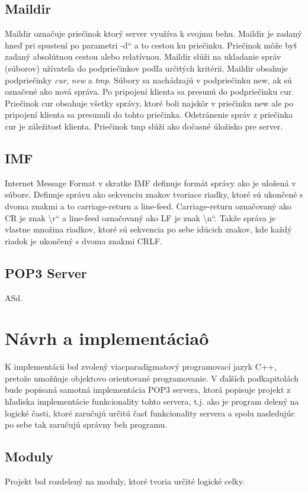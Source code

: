 \documentclass[11pt,a4paper]{article}
\providecommand{\uv}[1]{\quotedblbase #1\textquotedblleft}
\begin{document}
\subsection{Maildir}
Maildir označuje priečinok ktorý server využíva k svojmu behu. Maildir je zadaný hneď pri spustení po parametri \uv{-d} a to cestou ku priečinku. Priečinok môže byť zadaný absolútnou cestou alebo relatívnou. Maildir slúži na ukladanie správ (súborov) užívateľa do podpriečinkov podľa určitých kritérii. Maildir obsahuje podpriečinky \textit{cur}, \textit{new} a \textit{tmp}. Súbory sa nachádzajú v podpriečinku new, ak sú označené ako nová správa. Po pripojení klienta sa presunú do podpriečinku cur. Priečinok cur obsahuje všetky správy, ktoré boli najskôr v priečinku new ale po pripojení klienta sa presunuli do tohto priečinka. Odstránenie správ z priečinka cur je záležitosť klienta. Priečinok tmp slúži ako dočasné úložisko pre server.

\subsection{IMF}
Internet Message Format v skratke IMF definuje formát správy ako je uložená v súbore. Definuje správu ako sekvenciu znakov tvoriace riadky, ktoré sú ukončené s dvoma znakmi a to carriage-return a line-feed. Carriage-return označovaný ako CR je znak \uv{\textbackslash r} a line-feed označovaný ako LF je znak \uv{\textbackslash n}. Takže správa je vlastne množina riadkov, ktoré sú sekvencia po sebe idúcich znakov, kde každý riadok je ukončený s dvoma znakmi CRLF.

\subsection{POP3 Server}
ASd.

\section{Návrh a implementáciaô}

	K implementácii bol zvolený viacparadigmatový programovací jazyk C++, pretože umožňuje objektovo orientované programovanie. V ďalších podkapitolách bude popísaná samotná implementácia POP3 servera, ktorá popisuje projekt z hľadiska implementácie funkcionality tohto servera, t.j. ako je program delený na logické časti, ktoré zaručujú určitú časť funkcionality servera a spolu nasledujúc po sebe tak zaručujú správny beh programu.

	\subsection{Moduly}
		Projekt bol rozdelený na moduly, ktoré tvoria určité logické celky.
\end{document}
